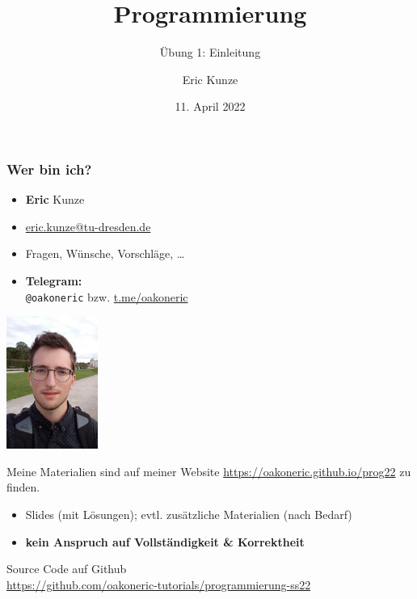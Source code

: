 \documentclass{beamer}
\begin{document}
	
	\title{Programmierung}
	\subtitle{Übung 1: Einleitung}
	\author{Eric Kunze}
	\date{11. April 2022}

	\maketitle
	
	\begin{frame} \frametitle{Wer bin ich?}
		\footnotesize
		\begin{minipage}{\dimexpr0.75\linewidth-\fboxrule-\fboxsep}
			\flushleft \normalsize
			\begin{itemize}
				\item \textbf{Eric} \textcolor{cdgray!50}{Kunze}
				\item \url{eric.kunze@tu-dresden.de}
				\item Fragen, Wünsche, Vorschläge, \dots 
				\item \textbf{Telegram:} \\ 
				\texttt{@oakoneric} bzw. \url{t.me/oakoneric}
			\end{itemize}
		\end{minipage}
		\begin{minipage}{\dimexpr0.25\linewidth-\fboxrule-\fboxsep}
			\includegraphics[width=3cm]{./tut01_pic.jpg}
		\end{minipage}		
	
		Meine Materialien sind auf meiner Website \url{https://oakoneric.github.io/prog22} zu finden.
		\begin{itemize}
			\item Slides (mit Lösungen); evtl. zusätzliche Materialien (nach Bedarf)
			\item \alert{\textbf{kein Anspruch auf Vollständigkeit \& Korrektheit}}
		\end{itemize}
		
		Source Code auf Github \\
		\url{https://github.com/oakoneric-tutorials/programmierung-ss22}
	\end{frame}
	
\end{document}
